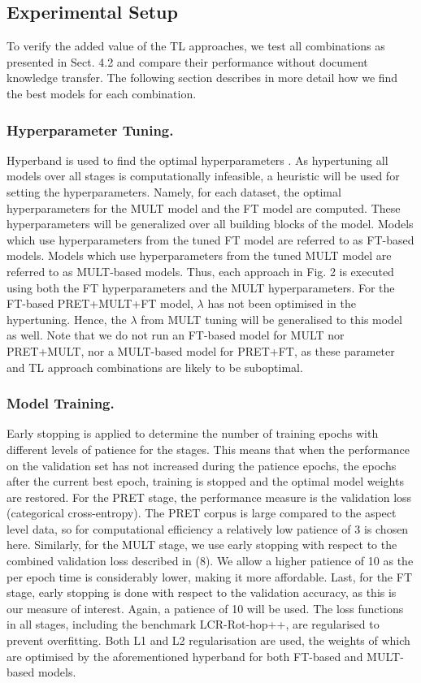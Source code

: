 \subsection{Experimental Setup}
To verify the added value of the TL approaches, we test all combinations as presented in Sect. 4.2 and compare their performance without document knowledge transfer. The following section describes in more detail how we find the best models for each combination.

\subsubsection{Hyperparameter Tuning.}

Hyperband is used to find the optimal hyperparameters \cite{Li2018}. As hypertuning all models over all stages is computationally infeasible, a heuristic  will be used for setting the hyperparameters. Namely, for each dataset, the optimal hyperparameters for the MULT model and the FT model are computed. These hyperparameters will be generalized over all building blocks of the model. Models which use hyperparameters from the tuned FT model are referred to as FT-based models. Models which use hyperparameters from the tuned MULT model are referred to as MULT-based models. Thus, each approach in Fig. 2 is executed using both the FT hyperparameters and the MULT hyperparameters. For the FT-based PRET+MULT+FT model, $\lambda$ has not been optimised in the hypertuning. Hence, the $\lambda$ from MULT tuning will be generalised to this model as well. Note that we do not run an FT-based model for MULT nor PRET+MULT, nor a MULT-based model for PRET+FT, as these parameter and TL approach combinations are likely to be suboptimal. 

\subsubsection{Model Training.}
Early stopping is applied to determine the number of training epochs with different levels of patience for the stages. This means that when the performance on the validation set has not increased during the patience epochs, the epochs after the current best epoch, training is stopped and the optimal model weights are restored. For the PRET stage, the performance measure is the validation loss (categorical cross-entropy). The PRET corpus is large compared to the aspect level data, so for computational efficiency a relatively low patience of 3 is chosen here. Similarly, for the MULT stage, we use early stopping with respect to the combined validation loss described in (8). We allow a higher patience of 10 as the per epoch time is considerably lower, making it more affordable. Last, for the FT stage, early stopping is done with respect to the validation accuracy, as this is our measure of interest. Again, a patience of 10 will be used. The loss functions in all stages, including the benchmark LCR-Rot-hop++, are regularised to prevent overfitting. Both L1 and L2 regularisation are used, the weights of which are optimised by the aforementioned hyperband for both FT-based and MULT-based models.

